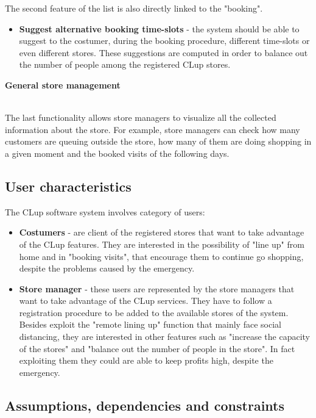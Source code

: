 \documentclass[]{article}
\begin{document}
The second feature of the list is also directly linked to the "booking".
\begin{itemize}
	\renewcommand{\labelitemi}{$-$}
	\item \textbf{Suggest alternative booking time-slots} - the system should be able to suggest to the costumer, during the booking procedure, different time-slots or even different stores. These suggestions are computed in order to balance out the number of people among the registered CLup stores.
\end{itemize}
\bigskip
\begin{large}
	\textbf{General store management}
\end{large}
\smallskip
\\
The last functionality allows store managers to visualize all the collected information about the store. For example, store managers can check how many customers are queuing outside the store, how many of them are doing shopping in a given moment and the booked visits of the following days.  

\newpage

\subsection{User characteristics}
The CLup software system involves category of users:
\begin{itemize}
	\renewcommand{\labelitemi}{$-$}
	\item \textbf{Costumers} - are client of the registered stores that want to take advantage of the CLup features. They are interested in the possibility of "line up" from home and in "booking visits", that encourage them to continue go shopping, despite the problems caused by the emergency.
	
	\item \textbf{Store manager} - these users are represented by the store managers that want to take advantage of the CLup services. They have to follow a registration procedure to be added to the available stores of the system. 
	\\Besides exploit the "remote lining up" function that mainly face social distancing, they are interested in other features such as "increase the capacity of the stores" and "balance out the number of people in the store". In fact exploiting them they could are able to keep profits high, despite the emergency. 		
\end{itemize}


\subsection{Assumptions, dependencies and constraints}
\end{document}
